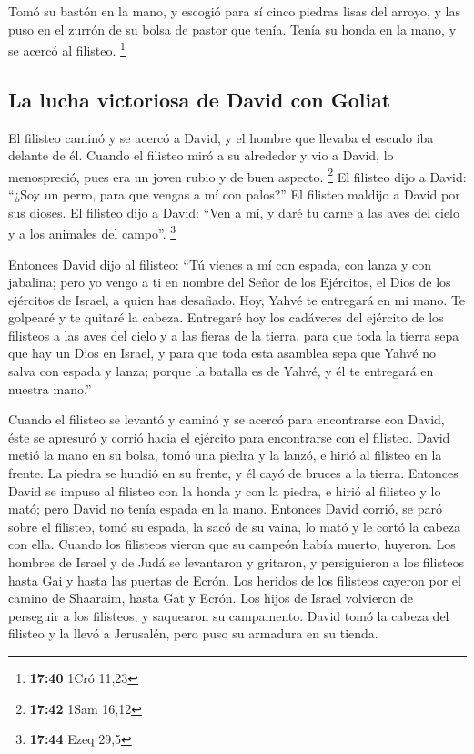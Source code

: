  Tomó su bastón en la mano, y escogió para sí cinco
piedras lisas del arroyo, y las puso en el zurrón de su bolsa de pastor
que tenía. Tenía su honda en la mano, y se acercó al filisteo.
\footnote{\textbf{17:40} 1Cró 11,23}

\hypertarget{la-lucha-victoriosa-de-david-con-goliat}{%
\subsection{La lucha victoriosa de David con
Goliat}\label{la-lucha-victoriosa-de-david-con-goliat}}

 El filisteo caminó y se acercó a David, y el hombre que
llevaba el escudo iba delante de él.  Cuando el filisteo
miró a su alrededor y vio a David, lo menospreció, pues era un joven
rubio y de buen aspecto. \footnote{\textbf{17:42} 1Sam 16,12}
 El filisteo dijo a David: ``¿Soy un perro, para que
vengas a mí con palos?'' El filisteo maldijo a David por sus dioses.
 El filisteo dijo a David: ``Ven a mí, y daré tu carne a
las aves del cielo y a los animales del campo''. \footnote{\textbf{17:44}
  Ezeq 29,5}

 Entonces David dijo al filisteo: ``Tú vienes a mí con
espada, con lanza y con jabalina; pero yo vengo a ti en nombre del Señor
de los Ejércitos, el Dios de los ejércitos de Israel, a quien has
desafiado.  Hoy, Yahvé te entregará en mi mano. Te
golpearé y te quitaré la cabeza. Entregaré hoy los cadáveres del
ejército de los filisteos a las aves del cielo y a las fieras de la
tierra, para que toda la tierra sepa que hay un Dios en Israel,
 y para que toda esta asamblea sepa que Yahvé no salva
con espada y lanza; porque la batalla es de Yahvé, y él te entregará en
nuestra mano.''

 Cuando el filisteo se levantó y caminó y se acercó para
encontrarse con David, éste se apresuró y corrió hacia el ejército para
encontrarse con el filisteo.  David metió la mano en su
bolsa, tomó una piedra y la lanzó, e hirió al filisteo en la frente. La
piedra se hundió en su frente, y él cayó de bruces a la tierra.
 Entonces David se impuso al filisteo con la honda y con
la piedra, e hirió al filisteo y lo mató; pero David no tenía espada en
la mano.  Entonces David corrió, se paró sobre el
filisteo, tomó su espada, la sacó de su vaina, lo mató y le cortó la
cabeza con ella. Cuando los filisteos vieron que su campeón había
muerto, huyeron.  Los hombres de Israel y de Judá se
levantaron y gritaron, y persiguieron a los filisteos hasta Gai y hasta
las puertas de Ecrón. Los heridos de los filisteos cayeron por el camino
de Shaaraim, hasta Gat y Ecrón.  Los hijos de Israel
volvieron de perseguir a los filisteos, y saquearon su campamento.
 David tomó la cabeza del filisteo y la llevó a
Jerusalén, pero puso su armadura en su tienda.

